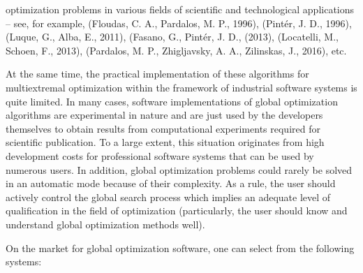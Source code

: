 \documentclass{gOMS2e}
\theoremstyle{plain}%
\theoremstyle{definition}
\theoremstyle{remark}
\begin{document}
optimization problems in various fields of scientific and technological applications – see,
for example, (Floudas, C. A., Pardalos, M. P., 1996), (Pintér, J. D., 1996), (Luque, G., Alba, E., 2011), (Fasano, G., Pintér, J. D., (2013), (Locatelli, M., Schoen, F., 2013), (Pardalos, M. P., Zhigljavsky, A. A., Zilinskas, J., 2016), etc.
\par
At the same time, the practical implementation of these algorithms for multiextremal
optimization within the framework of industrial software systems is quite limited.
In many cases, software implementations of global optimization algorithms are experimental in
nature and are just used by the developers themselves to obtain results from computational
experiments required for scientific publication. To a large extent, this situation
originates from high development costs for professional software systems that can be
used by numerous users. In addition, global optimization problems could rarely be
solved in an automatic mode because of their complexity. As a rule, the user should
actively control the global search process which implies an adequate level of
qualification in the field of optimization (particularly, the user should know and
understand global optimization methods well).
\par
On the market for global optimization software, one can select from the following systems:
\end{document}
